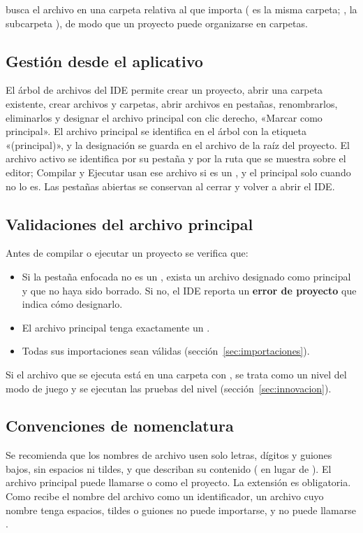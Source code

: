  busca el archivo en una carpeta relativa al que importa ( es la misma carpeta; , la subcarpeta ), de modo que un proyecto puede organizarse en carpetas.

\subsection{Gestión desde el aplicativo}

El árbol de archivos del IDE permite crear un proyecto, abrir una carpeta existente, crear archivos y carpetas, abrir archivos en pestañas, renombrarlos, eliminarlos y designar el archivo principal con clic derecho, «Marcar como principal». El archivo principal se identifica en el árbol con la etiqueta «(principal)», y la designación se guarda en el archivo  de la raíz del proyecto. El archivo activo se identifica por su pestaña y por la ruta que se muestra sobre el editor; Compilar y Ejecutar usan ese archivo si es un , y el principal solo cuando no lo es. Las pestañas abiertas se conservan al cerrar y volver a abrir el IDE.

\subsection{Validaciones del archivo principal}

Antes de compilar o ejecutar un proyecto se verifica que:
\begin{itemize}
  \item Si la pestaña enfocada no es un , exista un archivo designado como principal y que no haya sido borrado. Si no, el IDE reporta un \textbf{error de proyecto} que indica cómo designarlo.
  \item El archivo principal tenga exactamente un .
  \item Todas sus importaciones sean válidas (sección~\ref{sec:importaciones}).
\end{itemize}

Si el archivo que se ejecuta está en una carpeta con , se trata como un nivel del modo de juego y se ejecutan las pruebas del nivel (sección~\ref{sec:innovacion}).

\subsection{Convenciones de nomenclatura}

Se recomienda que los nombres de archivo usen solo letras, dígitos y guiones bajos, sin espacios ni tildes, y que describan su contenido ( en lugar de ). El archivo principal puede llamarse  o como el proyecto. La extensión  es obligatoria. Como  recibe el nombre del archivo como un identificador, un archivo cuyo nombre tenga espacios, tildes o guiones no puede importarse, y no puede llamarse .

